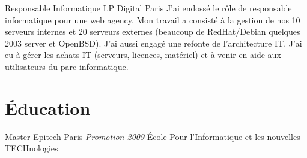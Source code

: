 \documentclass[11pt,a4paper,sans]{moderncv}
\begin{document}
{Responsable Informatique}
{LP Digital}
{Paris}
{}
{J'ai endoss\'e le r\^ole de responsable informatique pour une web agency.\newline{}
Mon travail a consist\'e \`a la gestion de nos 10 serveurs internes et 20 serveurs
externes (beaucoup de RedHat/Debian quelques 2003 server et OpenBSD). J'ai aussi
engag\'e une refonte de l'architecture IT.
J'ai eu \`a g\'erer les achats IT (serveurs, licences, mat\'eriel) et \`a venir en aide
aux utilisateurs du parc informatique.
}
\section{\'Education}

{Master}
{Epitech}
{Paris}
{\textit{Promotion 2009}}
{\'Ecole Pour l'Informatique et les nouvelles TECHnologies}
\end{document}
